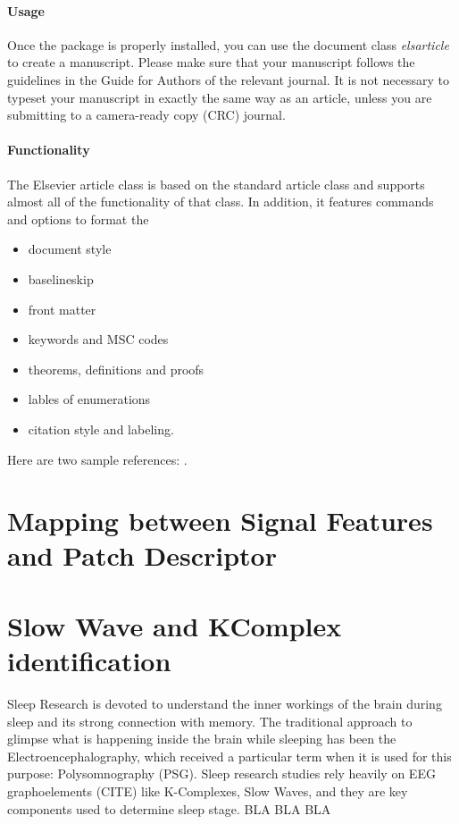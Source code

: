 \documentclass[review]{elsarticle}
\begin{document}
\paragraph{Usage} Once the package is properly installed, you can use the document class \emph{elsarticle} to create a manuscript. Please make sure that your manuscript follows the guidelines in the Guide for Authors of the relevant journal. It is not necessary to typeset your manuscript in exactly the same way as an article, unless you are submitting to a camera-ready copy (CRC) journal.

\paragraph{Functionality} The Elsevier article class is based on the standard article class and supports almost all of the functionality of that class. In addition, it features commands and options to format the
\begin{itemize}
\item document style
\item baselineskip
\item front matter
\item keywords and MSC codes
\item theorems, definitions and proofs
\item lables of enumerations
\item citation style and labeling.
\end{itemize}

Here are two sample references: \cite{Feynman1963118,Dirac1953888}.

\section{Mapping between Signal Features and Patch Descriptor}

\section{Slow Wave and KComplex identification}

Sleep Research is devoted to understand the inner workings of the brain during sleep and its strong connection with memory.  The traditional approach to glimpse what is happening inside the brain while sleeping has been the Electroencephalography, which received a particular term when it is used for this purpose: Polysomnography (PSG).  Sleep research studies rely heavily on EEG graphoelements (CITE) like K-Complexes, Slow Waves, and they are key components used to determine sleep stage. BLA BLA BLA
\end{document}
